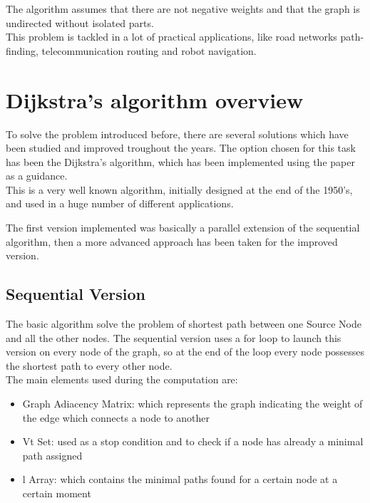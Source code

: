 \documentclass[
	a4paper, %
	12pt, %
]{class}
\begin{document}
The algorithm assumes that there are not negative weights and that the graph is undirected without isolated parts.\\

This problem is tackled in a lot of practical applications, like road networks path-finding, telecommunication routing and robot navigation.

\section{Dijkstra’s algorithm overview}
To solve the problem introduced before, there are several solutions which have been studied and improved troughout the years.
The option chosen for this task has been the Dijkstra’s algorithm, which has been implemented using the paper \cite{paper}
as a guidance.\\

This is a very well known algorithm, initially designed at the end of the 1950's, and used in a huge number of different applications.

The first version implemented was basically a parallel extension of the sequential algorithm,
then a more advanced approach has been taken for the improved version.

\newpage
\subsection{Sequential Version}
The basic algorithm solve the problem of shortest path between one Source Node and all the other nodes. The sequential version uses a for loop
to launch this version on every node of the graph, so at the end of the loop every node possesses the shortest path to every other node.\\

The main elements used during the computation are:\\
\begin{itemize}
    \item Graph Adiacency Matrix: which represents the graph indicating the weight of the edge which connects a node to another
    \item Vt Set: used as a stop condition and to check if a node has already a minimal path assigned
    \item l Array: which contains the minimal paths found for a certain node at a certain moment\\
\end{itemize}
\end{document}

